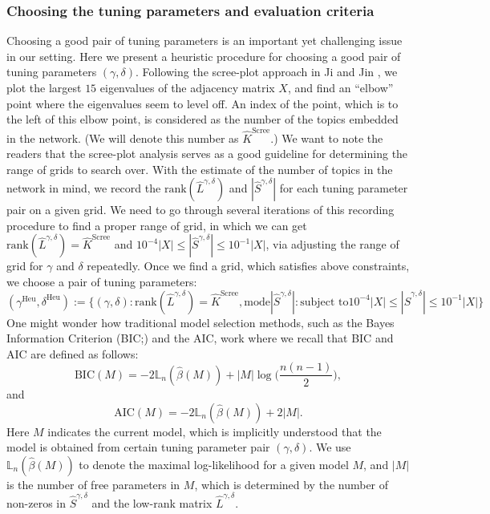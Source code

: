 \documentclass[AMS,STIX1COL]{WileyNJD-v2}
\begin{document}
{\subsubsection{Choosing the tuning parameters and evaluation criteria}
Choosing a good pair of tuning parameters is an important yet challenging issue in our setting.
Here we present a heuristic procedure for choosing a good pair of tuning parameters $(\gamma,\delta)$.
Following the scree-plot approach in Ji and Jin \cite{ji2016coauthorship}, we plot the largest $15$ eigenvalues of the adjacency matrix $X$, and find an ``elbow'' point where the eigenvalues seem to level off.
An index of the point, which is to the left of this elbow point, is considered as the number of the topics embedded in the network.
(We will denote this number as $\widehat{K}^{\text{Scree}}$.)
We want to note the readers that the scree-plot analysis serves as a good guideline for determining the range of grids to search over.
With the estimate of the number of topics in the network in mind, we record the $\text{rank}(\widehat{L}^{\gamma,\delta})$ and $|\widehat{S}^{\gamma,\delta}|$ for each tuning parameter pair on a given grid.
We need to go through several iterations of this recording procedure to find a proper range of grid, in which we can get $\text{rank}(\widehat{L}^{\gamma,\delta})=\widehat{K}^{\text{Scree}}$
and $10^{-4}|X| \leq |\widehat{S}^{\gamma,\delta}| \leq 10^{-1}|X|$, via adjusting the range of grid for $\gamma$ and $\delta$ repeatedly.
Once we find a grid, which satisfies above constraints, we choose a pair of tuning parameters: %
\[
    (\gamma^{\text{Heu}},\delta^{\text{Heu}}):=
    \big\{(\gamma,\delta): \text{rank}(\widehat{L}^{\gamma,\delta})=\widehat{K}^{\text{Scree}},
    \mbox{mode} |\widehat{S}^{\gamma,\delta}|: \mbox{subject to} 10^{-4}|X| \leq |\widehat{S}^{\gamma,\delta}| \leq 10^{-1}|X| \big\}
\]
One might wonder how traditional model selection methods, such as the Bayes Information Criterion (BIC;\cite{schwarz1978estimating}) and the AIC, work where we recall that BIC and AIC are defined as follows:
\[
\mbox{BIC}(M) = -2  \mathbb{L}_n( \hat{\beta}(M)) + |M| \log \bigg(\frac{n(n-1)}{2}\bigg),
\]
and
\[
\mbox{AIC}(M) = -2  \mathbb{L}_n( \hat{\beta}(M)) + 2|M|.
\]
Here $M$ indicates the current model, which is implicitly understood that the model is obtained from certain tuning parameter pair $(\gamma,\delta)$.
We use $\mathbb{L}_n( \hat{\beta}(M))$ to denote the maximal log-likelihood for a given model $M$,
and $|M|$ is the number of free parameters in $M$, which is determined by the number of non-zeros in $\widehat{S}^{\gamma,\delta}$ and the low-rank matrix $\widehat{L}^{\gamma,\delta}$.
}
\end{document}
